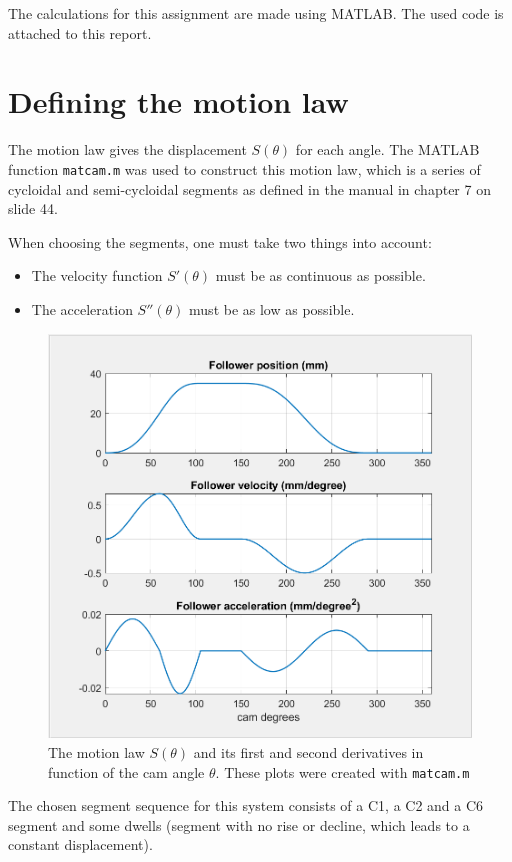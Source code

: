 \documentclass[a4paper]{article}
\begin{document}
The calculations for this assignment are made using MATLAB. The used code is attached to this report.

\clearpage
\tableofcontents

\section{Defining the motion law}

The motion law gives the displacement \(S(\theta)\) for each angle. The MATLAB function \texttt{matcam.m} was used to construct this motion law, which is a series of cycloidal and semi-cycloidal segments as defined in the manual \cite{cursus} in chapter 7 on slide 44.

When choosing the segments, one must take two things into account:
\begin{itemize}
	\item The velocity function \(S'(\theta)\) must be as continuous as possible.
	\item The acceleration \(S''(\theta)\) must be as low as possible.
\end{itemize}


\begin{figure}[H]
	\centering
	\includegraphics[width=.7\textwidth]{hefwet.png}
	\caption{The motion law \(S(\theta)\) and its first and second derivatives in function of the cam angle \(\theta\). These plots were created with \texttt{matcam.m}}
	\label{fig:hefwet}
	
\end{figure}

The chosen segment sequence for this system consists of a C1, a C2 and a C6 segment and some dwells (segment with no rise or decline, which leads to a constant displacement).
\end{document}
